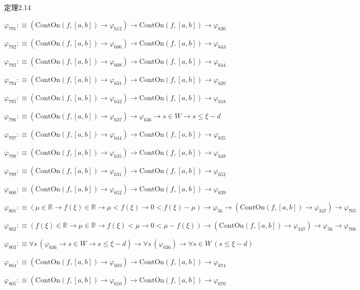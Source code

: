 \begin{fullproof}{定理2.14}
\begin{abbrevlist}
\item $\varphi_{791} :\equiv (\mathrm{ContOn}(f,[a,b]) \to \varphi_{612}) \to \mathrm{ContOn}(f,[a,b]) \to \varphi_{630}$
\item $\varphi_{792} :\equiv (\mathrm{ContOn}(f,[a,b]) \to \varphi_{606}) \to \mathrm{ContOn}(f,[a,b]) \to \varphi_{643}$
\item $\varphi_{793} :\equiv (\mathrm{ContOn}(f,[a,b]) \to \varphi_{608}) \to \mathrm{ContOn}(f,[a,b]) \to \varphi_{644}$
\item $\varphi_{794} :\equiv (\mathrm{ContOn}(f,[a,b]) \to \varphi_{631}) \to \mathrm{ContOn}(f,[a,b]) \to \varphi_{620}$
\item $\varphi_{795} :\equiv (\mathrm{ContOn}(f,[a,b]) \to \varphi_{642}) \to \mathrm{ContOn}(f,[a,b]) \to \varphi_{618}$
\item $\varphi_{796} :\equiv (\mathrm{ContOn}(f,[a,b]) \to \varphi_{637}) \to \varphi_{636} \to s \in W \to s \leq \xi - d$
\item $\varphi_{797} :\equiv (\mathrm{ContOn}(f,[a,b]) \to \varphi_{644}) \to \mathrm{ContOn}(f,[a,b]) \to \varphi_{635}$
\item $\varphi_{798} :\equiv (\mathrm{ContOn}(f,[a,b]) \to \varphi_{635}) \to \mathrm{ContOn}(f,[a,b]) \to \varphi_{648}$
\item $\varphi_{799} :\equiv (\mathrm{ContOn}(f,[a,b]) \to \varphi_{631}) \to \mathrm{ContOn}(f,[a,b]) \to \varphi_{652}$
\item $\varphi_{800} :\equiv (\mathrm{ContOn}(f,[a,b]) \to \varphi_{652}) \to \mathrm{ContOn}(f,[a,b]) \to \varphi_{639}$
\item $\varphi_{801} :\equiv (\mu \in \mathbb{R} \to f(\xi) \in \mathbb{R} \to \mu < f(\xi) \to 0 < f(\xi) - \mu) \to \varphi_{56} \to (\mathrm{ContOn}(f,[a,b]) \to \varphi_{347}) \to \varphi_{705}$
\item $\varphi_{802} :\equiv (f(\xi) \in \mathbb{R} \to \mu \in \mathbb{R} \to f(\xi) < \mu \to 0 < \mu - f(\xi)) \to (\mathrm{ContOn}(f,[a,b]) \to \varphi_{347}) \to \varphi_{56} \to \varphi_{706}$
\item $\varphi_{803} :\equiv \forall s\,(\varphi_{636} \to s \in W \to s \leq \xi - d) \to \forall s\,(\varphi_{636}) \to \forall s \in W\,(s \leq \xi - d)$
\item $\varphi_{804} :\equiv (\mathrm{ContOn}(f,[a,b]) \to \varphi_{603}) \to \mathrm{ContOn}(f,[a,b]) \to \varphi_{674}$
\item $\varphi_{805} :\equiv (\mathrm{ContOn}(f,[a,b]) \to \varphi_{610}) \to \mathrm{ContOn}(f,[a,b]) \to \varphi_{670}$

\end{abbrevlist}
\end{fullproof}
